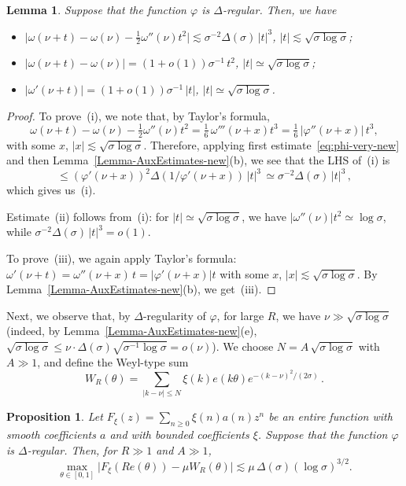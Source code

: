 \documentclass[11pt]{amsart}
\numberwithin{equation}{section}
\newtheorem{lemma}{Lemma}[section]
\newtheorem{proposition}{Proposition}
\begin{document}
\begin{lemma}\label{Lemma-omega}
Suppose that the function $\varphi$ is $\Delta$-regular.
Then, we have
\begin{itemize}
\item[{\rm (i)}]
$\bigl| \omega (\nu +t) - \omega (\nu) - \tfrac12 \omega''(\nu)t^2 \bigr|
\lesssim \sigma^{-2}\Delta (\sigma)\,|t|^3$, \quad
$|t|\lesssim \sqrt{\sigma\log\sigma}$;
\item[{\rm (ii)}]
$ \bigl| \omega (\nu +t) - \omega (\nu) \bigr| = (1+o(1)) \sigma^{-1}\, t^2$,
\quad
$|t|\simeq \sqrt{\sigma \log\sigma}$;
\item[{\rm (iii)}]
$\bigl| \omega'(\nu+t) \bigr| = (1+o(1)) \sigma^{-1}\, |t|$,
\quad $|t|\simeq \sqrt{\sigma\log\sigma}$.
\end{itemize}
\end{lemma}

\begin{proof}
To prove~(i), we note that, by Taylor's formula,
\[
\omega (\nu +t) - \omega (\nu) - \tfrac12 \omega''(\nu)t^2 =
\tfrac16\, \omega'''(\nu+x) t^3
= \tfrac16\, |\varphi''(\nu+x)|\, t^3,
\]
with some $x$,  $|x|\lesssim  \sqrt{\sigma\log\sigma}$. Therefore, applying first
estimate~\eqref{eq:phi-very-new} and then
Lemma~\ref{Lemma-AuxEstimates-new}(b), we see that the LHS of~(i) is
\[
\le  (\varphi' (\nu+x))^2 \Delta(1/\varphi'(\nu+x))\, |t|^3\,
\simeq \sigma^{-2}\Delta(\sigma)\, |t|^3\, ,
\]
which gives us~(i).

Estimate~(ii) follows from~(i): for $|t|\simeq \sqrt{\sigma \log\sigma}$, we have
$ |\omega''(\nu)| t^2 \simeq \log\sigma $, while
$ \sigma^{-2}\Delta(\sigma)\, |t|^3 = o(1) $.

To prove~(iii), we again apply Taylor's formula:
$ \omega'(\nu+t) = \omega''(\nu+x)\, t = |\varphi'(\nu+x)| t $
with some $x$, $|x|\lesssim\sqrt{\sigma\log\sigma}$. By Lemma~\ref{Lemma-AuxEstimates-new}(b),
we get~(iii).
\end{proof}

Next, we observe that, by $\Delta$-regularity of $\varphi$,
for large $R$, we have $\nu \gg \sqrt{\sigma\log \sigma}$
(indeed, by Lemma~\ref{Lemma-AuxEstimates-new}(e),
$ \sqrt{\sigma\log \sigma} \le \nu \cdot \Delta(\sigma) \sqrt{\sigma^{-1}\log\sigma} = o(\nu) $).
We choose
$N = A\, \sqrt{\sigma\log\sigma}$ with $A\gg 1$, and define the Weyl-type sum
\[
W_R (\theta) = \sum_{|k-\nu|\le N} \xi (k) e(k\theta) e^{-(k-\nu)^2/(2\sigma)}\,.
\]

\begin{proposition}\label{LemmaL-W-V}
Let $F_\xi(z)=\sum_{n\ge 0} \xi(n) a(n) z^n$
be an entire function with smooth coefficients $a$ and with
bounded coefficients $\xi$. Suppose that the function $\varphi$ is $\Delta$-regular.
Then, for $R\gg 1$ and $A\gg 1$,
\[
\max_{\theta\in[0,1]}\bigl| F_\xi (Re(\theta)) - \mu W_R(\theta) \bigr| \lesssim
\mu\, \Delta(\sigma)(\log\sigma)^{3/2}.
\]
\end{proposition}
\end{document}
